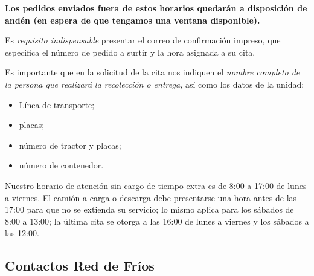\textbf{Los pedidos enviados fuera de estos horarios quedarán a disposición de andén (en espera de que tengamos una ventana disponible).}

Es \emph{requisito indispensable} presentar el correo de confirmación impreso, que especifica el número de pedido a surtir y la hora asignada a su cita.

Es importante que en la solicitud de la cita nos indiquen el \emph{nombre completo de la persona que realizará la recolección o entrega,} así como los datos de la unidad:
\begin{itemize}
	\item Línea de transporte;
	\item placas;
	\item número de tractor y placas;
	\item número de contenedor.
\end{itemize}

Nuestro horario de atención sin cargo de tiempo extra es de 8:00 a 17:00 de lunes a viernes. El camión a carga o descarga debe presentarse una hora antes de las 17:00 para que no se extienda su servicio; lo mismo aplica para los sábados de 8:00 a 13:00; la última cita se otorga a las 16:00 de lunes a viernes y los sábados a las 12:00.

\subsection{Contactos Red de Fríos}

\noindent
{}
\\[1cm]
\\[1cm]
\\[1cm]
\\[1cm]

